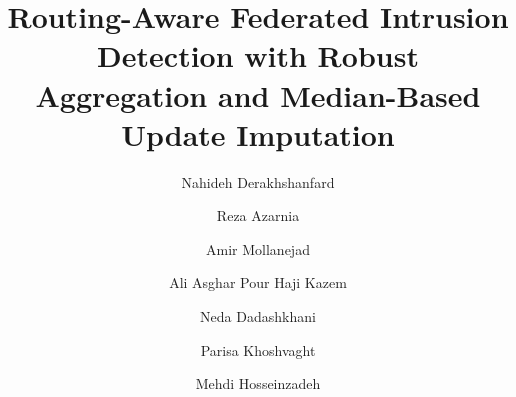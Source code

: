 \documentclass[5p,times,numafflabel]{elsarticle}
\begin{document}
	
	\begin{frontmatter}
		\title{Routing-Aware Federated Intrusion Detection with Robust
			Aggregation and Median-Based Update Imputation}
		

\author[1]{Nahideh Derakhshanfard}
\author[1]{Reza Azarnia}
\author[2]{Amir Mollanejad}
\author[3]{Ali Asghar Pour Haji Kazem}
\author[4]{Neda Dadashkhani}
\author[5]{Parisa Khoshvaght}
\author[6]{Mehdi Hosseinzadeh}


\address[1]{Department of Computer Engineering,
	Tabriz Branch, Islamic Azad University,
	Tabriz, Iran}

\address[2]{Department of Computer Engineering,
	Aras Branch, Islamic Azad University,
	Jolfa, Iran}

\address[3]{Department of Software Engineering,
	Faculty of Engineering and Natural Sciences,
	Istinye University,
	Istanbul, Turkey}

\address[4]{Computer Programming Program,
	Vocational School,
	Istinye University,
	Istanbul, Turkey}

\address[5]{Institute of Research and Development,
	Duy Tan University,
	Da Nang, Vietnam}

\address[6]{School of Engineering \& Technology,
	Duy Tan University,
	Da Nang, Vietnam}

	


\end{frontmatter}
\end{document}
